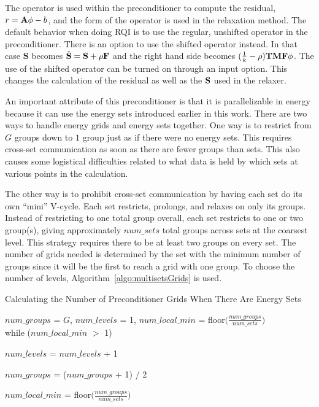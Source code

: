 The operator is used within the preconditioner to compute the residual, $r = \mathbf{A}\phi - b$, and the form of the operator is used in the relaxation method. The default behavior when doing RQI is to use the regular, unshifted operator in the preconditioner. There is an option to use the shifted operator instead. In that case $\mathbf{S}$ becomes $\tilde{\mathbf{S}} = \mathbf{S} + \rho\mathbf{F}$ and the right hand side becomes $(\frac{1}{k} - \rho)\mathbf{TMF}\phi$. The use of the shifted operator can be turned on through an input option. This changes the calculation of the residual as well as the $\mathbf{S}$ used in the relaxer.

An important attribute of this preconditioner is that it is parallelizable in energy because it can use the energy sets introduced earlier in this work. There are two ways to handle energy grids and energy sets together. One way is to restrict from $G$ groups down to $1$ group just as if there were no energy sets. This requires cross-set communication as soon as there are fewer groups than sets. This also causes some logistical difficulties related to what data is held by which sets at various points in the calculation. 

The other way is to prohibit cross-set communication by having each set do its own ``mini'' V-cycle. Each set restricts, prolongs, and relaxes on only its groups. Instead of restricting to one total group overall, each set restricts to one or two group(s), giving approximately $num\_sets$ total groups across sets at the coarsest level. This strategy requires there to be at least two groups on every set. The number of grids needed is determined by the set with the minimum number of groups since it will be the first to reach a grid with one group. To choose the number of levels, Algorithm~\ref{algo:multisetsGrids} is used. 
%
\begin{algorithm}
  \caption{ Calculating the Number of Preconditioner Grids When There Are Energy Sets}
  \label{algo:multisetsGrids}
   $num\_groups$ = $G$, $num\_levels$ = 1, $num\_local\_min$ = floor$\bigl( \frac{num\_groups}{num\_sets}\bigr)$ \\
   while ($num\_local\_min$ $>$ 1)
  \begin{list}{}{\hspace{2.5em}}
    \item $num\_levels$ = $num\_levels$ + 1
    \item $num\_groups$ = ($num\_groups$ + 1) / 2
    \item $num\_local\_min$ = floor$\bigl( \frac{num\_groups}{num\_sets}\bigr)$
   \end{list}
\end{algorithm}

